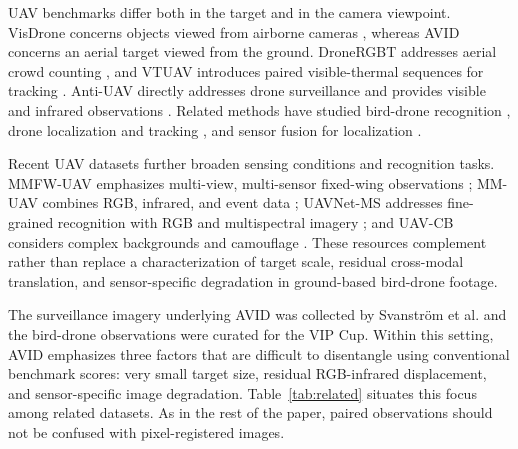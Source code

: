 \documentclass[10pt]{article}
\newcommand{\dataset}{\textsc{AVID}}
\begin{document}
UAV benchmarks differ both in the target and in the camera viewpoint. VisDrone concerns objects viewed from airborne cameras \citep{zhu2022visdrone}, whereas \dataset{} concerns an aerial target viewed from the ground. DroneRGBT addresses aerial crowd counting \citep{peng2020dronergbt}, and VTUAV introduces paired visible-thermal sequences for tracking \citep{zhang2022vtuav}. Anti-UAV directly addresses drone surveillance and provides visible and infrared observations \citep{jiang2023antiuav,antiuavrepo}. Related methods have studied bird-drone recognition \citep{selvi2022deep}, drone localization and tracking \citep{10193217,10328384}, and sensor fusion for localization \citep{11700652}.

Recent UAV datasets further broaden sensing conditions and recognition tasks. MMFW-UAV emphasizes multi-view, multi-sensor fixed-wing observations \citep{liu2025mmfwuav}; MM-UAV combines RGB, infrared, and event data \citep{xu2025mmuav}; UAVNet-MS addresses fine-grained recognition with RGB and multispectral imagery \citep{luo2026uavnetms}; and UAV-CB considers complex backgrounds and camouflage \citep{huang2026uavcb}. These resources complement rather than replace a characterization of target scale, residual cross-modal translation, and sensor-specific degradation in ground-based bird-drone footage.

The surveillance imagery underlying \dataset{} was collected by Svanstr\"om et al. \citep{svanstrom2021multisensor} and the bird-drone observations were curated for the VIP Cup. Within this setting, \dataset{} emphasizes three factors that are difficult to disentangle using conventional benchmark scores: very small target size, residual RGB-infrared displacement, and sensor-specific image degradation. Table~\ref{tab:related} situates this focus among related datasets. As in the rest of the paper, paired observations should not be confused with pixel-registered images.
\end{document}
